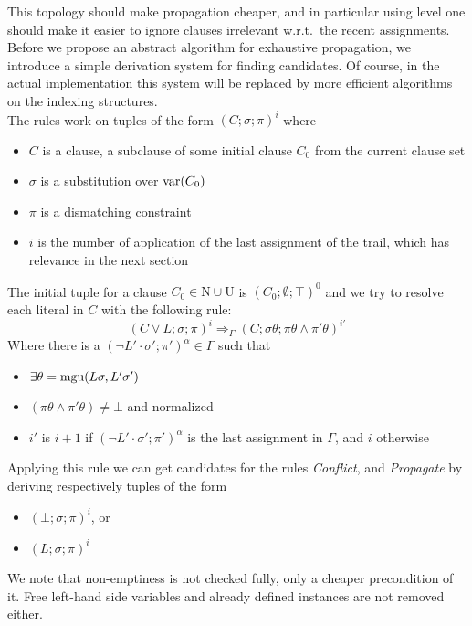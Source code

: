 \documentclass[a4paper]{article}
\newcommand{\leaveabit}{\\[6 pt]}
\begin{document}
This topology should make propagation cheaper, and in particular 
using level one should make it easier to ignore clauses irrelevant w.r.t.\ the recent assignments.
Before we propose an abstract algorithm for exhaustive propagation, 
we introduce a simple derivation system for finding candidates. 
Of course, in the actual implementation this system will be replaced by more efficient algorithms on 
the indexing structures. 
\leaveabit\noindent
The rules work on tuples of the form $(C; \sigma; \pi)^i$ where
\begin{itemize}
	\item $C$ is a clause, a subclause of some initial clause $C_0$ from the current clause set
	\item $\sigma$ is a substitution over $\operatorname{var}(C_0)$
	\item $\pi$ is a dismatching constraint 
	\item $i$ is the number of application of the last assignment of the trail, which has relevance in the next section
\end{itemize}
The initial tuple for a clause $C_0 \in \text{N}\cup\text{U}$ is $(C_0; \emptyset; \top)^0$ and we try to resolve each literal in $C$ with the following rule:
\[
	(C \lor L; \sigma; \pi)^i \Rightarrow_{\Gamma} 
	(C; \sigma\theta; \pi\theta \land \pi'\theta)^{i'}
\]
Where there is a $(\neg L'\cdot\sigma'; \pi')^{\alpha} \in \Gamma$ such that
\begin{itemize}
	\item $\exists\theta = \operatorname{mgu}(L\sigma, L'\sigma')$
	\item $(\pi\theta \land \pi'\theta) \ne \bot$ and normalized
	\item $i'$ is $i +1$ if $(\neg L'\cdot\sigma'; \pi')^{\alpha}$ is the last assignment in $\Gamma$, and $i$ otherwise
\end{itemize}
Applying this rule we can get candidates for the rules \emph{Conflict}, and \emph{Propagate} by deriving respectively tuples of the form
\begin{itemize}
	\item $(\bot; \sigma; \pi)^i$, or
	\item $(L; \sigma; \pi)^i$
\end{itemize}
We note that non-emptiness is not checked fully, only a cheaper precondition of it. 
Free left-hand side variables and already defined instances are not removed either.
\end{document}
